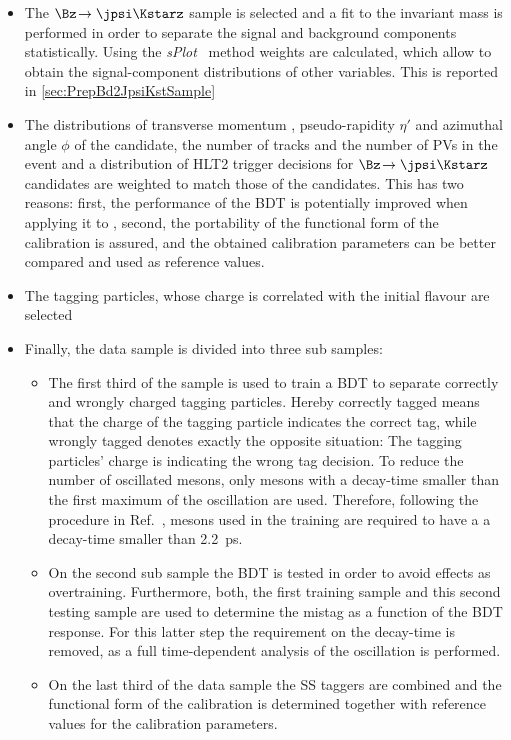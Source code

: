\begin{itemize}
	\item The $\Bz\!\to\jpsi\Kstarz$ sample is selected and a fit to the invariant mass is performed in order to separate the signal and background components statistically.
	Using the \emph{sPlot}~\cite{Pivk:2004ty} method weights are calculated, which allow to obtain the signal-component distributions of other variables. This is reported in \cref{sec:PrepBd2JpsiKstSample}
	\item The distributions of transverse momentum \pt, pseudo-rapidity $\eta'$ and azimuthal angle $\phi$ of the \Bz candidate, the number of tracks and the number of \ac{PV}s in the event and a distribution of HLT2 trigger decisions for $\Bz\!\to\jpsi\Kstarz$ candidates are weighted to match those of the \BdToDpi candidates.
	This has two reasons:
	first, the performance of the BDT is potentially improved when applying it to \BdToDpi, second, the portability of the functional form of the calibration is assured, and the obtained calibration parameters can be better compared and used as reference values.
	\item The tagging particles, whose charge is correlated with the initial \B flavour are selected
	\item Finally, the data sample is divided into three sub samples:
	\begin{itemize}
		\item The first third of the sample is used to train a BDT to separate correctly and wrongly charged tagging particles.
		Hereby correctly tagged means that the charge of the tagging particle indicates the correct tag, while wrongly tagged denotes exactly the opposite situation: The tagging particles' charge is indicating the wrong tag decision.
		To reduce the number of oscillated \Bz mesons, only \Bz mesons with a decay-time smaller than the first maximum of the oscillation are used.
		Therefore, following the procedure in Ref.~\cite{Aaij:2016rdg}, \Bz mesons used in the training are required to have a a decay-time smaller than \SI{2.2}{\pico\second}.
		\item On the second sub sample the BDT is tested in order to avoid effects as overtraining.
		Furthermore, both, the first training sample and this second testing sample are used to determine the mistag as a function of the BDT response. For this latter step the requirement on the \Bz decay-time is removed, as a full time-dependent analysis of the \Bz oscillation is performed.
		\item On the last third of the data sample the SS taggers are combined and the functional form of the calibration is determined together with reference values for the calibration parameters.
	\end{itemize}
\end{itemize}

